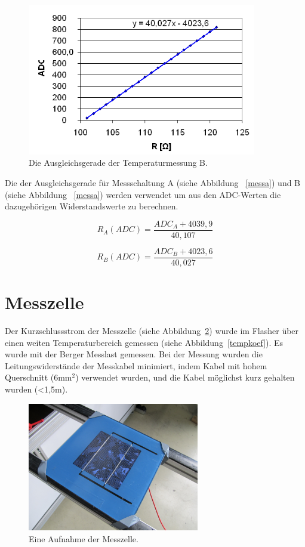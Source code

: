 \documentclass[a4paper,bibtotoc,oneside]{scrbook}
\begin{document}
\begin{figure}[htbp]
\centering
\includegraphics[width=100mm]{img/messb.png}
\caption{Die Ausgleichsgerade der Temperaturmessung B.}\label{messb}
\end{figure}

Die der Ausgleichsgerade für Messschaltung A (siehe Abbildung ~\ref{messa}) und B (siehe Abbildung ~\ref{messa}) werden verwendet um aus den ADC-Werten die dazugehörigen Widerstandswerte zu berechnen. 

  \begin{equation}
     R_A(ADC) = \frac{ADC_A + 4039,9}{40,107}
  \end{equation}
  
    \begin{equation}
     R_B(ADC) = \frac{ADC_B + 4023,6}{40,027}
  \end{equation}

 


\section{Messzelle}\thispagestyle{empty}


Der Kurzschlussstrom der Messzelle (siehe Abbildung~\ref{zelleflasher}) wurde im Flasher über einen weiten Temperaturbereich gemessen (siehe Abbildung~\ref{tempkoef}). Es wurde mit der Berger Messlast \cite{berger} gemessen. Bei der Messung wurden die Leitungswiderstände der Messkabel minimiert, indem Kabel mit hohem Querschnitt (6mm$^2$) verwendet wurden, und die Kabel möglichst kurz gehalten wurden (<1,5m).
 
\begin{figure}[htbp]
\centering
\includegraphics[width=75mm]{img/zelle.jpg}
\caption{Eine Aufnahme der Messzelle.}\label{zelleflasher}
\end{figure}
\end{document}
